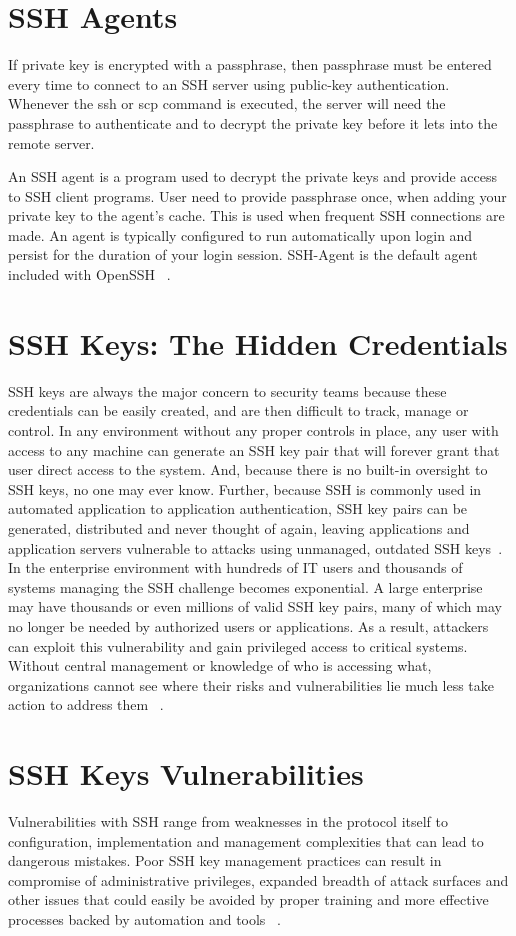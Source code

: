 \section{SSH Agents}
If private key is encrypted with a passphrase, then passphrase
must be entered every time to connect to an SSH server using
public-key authentication. Whenever the ssh or scp command is
executed, the server will need the passphrase to authenticate
and to decrypt the private key before it lets into the remote
server.

An SSH agent is a program used to decrypt the private
keys and provide access to SSH client programs. User need to
provide passphrase once, when adding your private key 
to the agent's cache. This is used when frequent SSH connections
are made. An agent is typically configured to run automatically 
upon login and persist for the duration of your login session. 
SSH-Agent is the default agent included with OpenSSH
~\cite{hid-sp18-513-sshkeyinc}.

\section{SSH Keys: The Hidden Credentials} 
SSH keys are always the major concern to security teams because 
these credentials can be easily created, and are then difficult to
track, manage or control. In any environment without any proper
controls in place, any user with access to any machine can generate
an SSH key pair that will forever grant that user direct access to
the system. And, because there is no built-in oversight to SSH keys,
no one may ever know. Further, because SSH is commonly used in 
automated application to application authentication,
SSH key pairs can be generated, distributed and never thought of again, 
leaving applications and application servers vulnerable to attacks 
using unmanaged, outdated SSH keys~\cite{hid-sp18-513-cyberark}. 
In the enterprise environment with hundreds of IT users and 
thousands of systems managing the SSH challenge becomes exponential. 
A large enterprise may have thousands or even millions of valid 
SSH key pairs, many of which may no longer be needed by authorized 
users or applications. As a result, attackers can exploit this 
vulnerability and gain privileged access to critical systems. 
Without central management or knowledge of who 
is accessing what, organizations cannot see where their risks and
vulnerabilities lie much less take action to address them
~\cite{hid-sp18-513-cyberark}. 

\section{SSH Keys Vulnerabilities}
Vulnerabilities with SSH range from weaknesses in the protocol
itself to configuration, implementation and management 
complexities that can lead to dangerous mistakes.
Poor SSH key management practices can result in compromise 
of administrative privileges, expanded breadth of attack surfaces
and other issues that could easily be avoided by proper training
and more effective processes backed by automation and tools
~\cite{hid-sp18-513-sans}.

